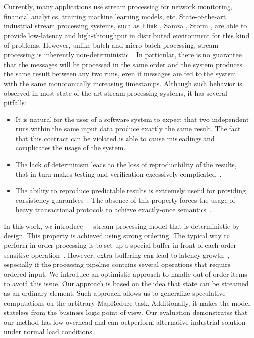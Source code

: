 
\label {fs-intro-seciton}

Currently, many  
applications use stream processing for network monitoring, financial analytics, training machine learning models, etc. 
State-of-the-art industrial stream processing systems, such as Flink \cite{carbone2015apache}, Samza \cite{Noghabi:2017:SSS:3137765.3137770}, Storm \cite{apache:storm}, are able to provide low-latency and high-throughput in distributed environment for this kind of problems. 
However, unlike batch and micro-batch processing, stream processing is inherently non-deterministic~\cite{Zaharia:2012:DSE:2342763.2342773}. 
In particular, there is no guarantee that the messages will be processed in the same order and the system produces the same result between any two runs, even if messages are fed to the system with the same monotonically increasing timestamps. 
Although such behavior is observed in most state-of-the-art stream processing systems, it has several 
pitfalls:

\begin{itemize}
 \item 
It is natural for the user of a software system to expect  that two independent runs within the same input data produce exactly the same result. The fact that this contract can be violated is able to cause misleadings and complicates the usage of the system.

    \item 
    The lack of determinism leads to the loss of reproducibility of the results, that in turn makes
    testing and verification excessively complicated~\cite{Zacheilas:2017:MDS:3093742.3093921}.
    \item 
    The ability to reproduce predictable results is extremely useful for providing consistency guarantees~\cite{Stonebraker:2005:RRS:1107499.1107504}. 
    The absence of this property forces the usage of heavy transactional protocols to achieve exactly-once semantics~\cite{Carbone:2017:SMA:3137765.3137777, jacques2016consistent}.
\end{itemize}

In this work, we introduce \FlameStream\ - stream processing model that is deterministic by design. This property is achieved using strong ordering. 
The typical way to perform in-order processing is to set up a special buffer in front of each order-sensitive operation~\cite{Li:2008:OPN:1453856.1453890}. 
However, extra buffering can lead to latency growth~\cite{Zacheilas:2017:MDS:3093742.3093921}, especially if the processing pipeline contains several operations that require ordered input. We introduce an optimistic approach to handle out-of-order items to avoid this issue. 
Our approach is based on the idea that state can be streamed as an ordinary element. 
Such approach allows us to generalize speculative computations on the arbitrary MapReduce task. 
Additionally, it makes the model stateless from the business logic point of view. Our evaluation demonstrates that our method has low overhead and can outperform alternative industrial solution under normal load conditions.

